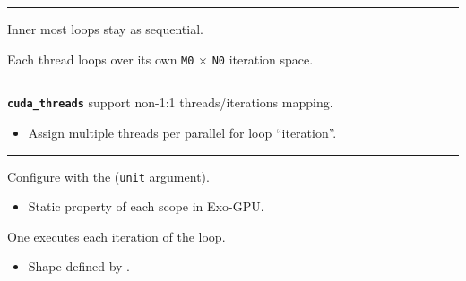 \newpage
{}

{\large

}

\vspace{3mm}
\hrule

{\LARGE
Inner most loops stay as sequential.

Each thread loops over its own \texttt{M0} $\times$ \texttt{N0} iteration space.

}

\newpage
{}

{\large

}

\vspace{3mm}
\hrule

{\LARGE
\texttt{\textbf{cuda\_threads}} support non-1:1 threads/iterations mapping.
\begin{itemize}
  \item Assign multiple threads per parallel for loop ``iteration''.
\end{itemize}

}

\newpage
{}

{\large

}

\vspace{3mm}
\hrule

{\LARGE

Configure with the  (\texttt{unit} argument).
\begin{itemize}
  \item Static property of each scope in Exo-GPU.
\end{itemize}

One  executes each iteration of the loop.
\begin{itemize}
  \item Shape defined by .
\end{itemize}

}

\newpage
{}

{\large

}

